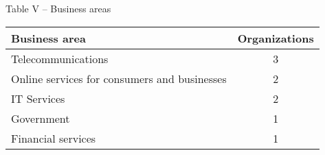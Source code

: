 \centering
Table V – Business areas

\begin{tabular}{ l c }
	\bfseries{Business area} & \bfseries{Organizations} \\
	\hline
	Telecommunications & 3 \\
	Online services for consumers and businesses & 2 \\
	IT Services & 2 \\
	Government & 1 \\
	Financial services & 1 \\
	\hline
\end{tabular}
\justify
